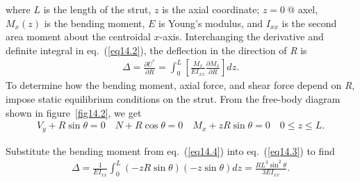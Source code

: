 \documentclass{AeroStructure-ERJohnson}
\begin{document}
\noindent where $L$ is the length of the strut, $z$ is the axial coordinate; $z=0\ @$ axel, $M_{x}(z)$ is the bending moment, $E$ is Young's modulus, and $I_{x x}$ is the second area moment about the centroidal $x$-axis. Interchanging the derivative and definite integral in eq.~(\ref{eq14.2}), the deflection in the direction of \textit{R} is
\begin{align}\label{eq14.3}
\Delta=\frac{\partial U^{*}}{\partial R}=\int_{0}^{L}\left[\frac{M_{x}}{E I_{x x}} \frac{\partial M_{x}}{\partial R}\right] d z.
\end{align}
To determine how the bending moment, axial force, and shear force depend on \textit{R}, impose static equilibrium conditions on the strut. From the free-body diagram shown in figure~\ref{fig14.2}, we get
\begin{align}\label{eq14.4}
V_{y}+R \sin \theta=0 \quad N+R \cos \theta=0 \quad M_{x}+z R \sin \theta=0 \quad 0 \leq z \leq L.
\end{align}

\vspace*{-1\baselineskip}
{\def\thefigure{14.2}
}
\vspace*{-1\baselineskip}

\noindent Substitute the bending moment from eq.~(\ref{eq14.4}) into eq.~(\ref{eq14.3}) to find%
\begin{align}\label{eq14.5}
\Delta=\frac{1}{E I_{x x}} \int_{0}^{L}(-z R \sin \theta)(-z \sin \theta) d z=\frac{R L^{3} \sin ^{2} \theta}{3 E I_{x x}}.
\end{align}
\vspace*{2pt}\vspace*{-8pt}
\pagebreak
\end{document}

